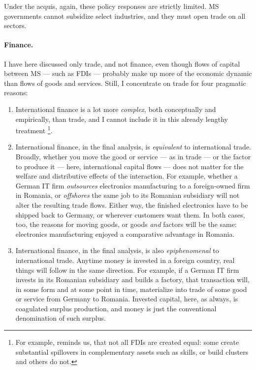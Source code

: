 \documentclass[11pt,a4paper,oneside,openright]{article}
\begin{document}
Under the acquis, again, these policy responses are strictly limited. 
\gls{MS} governments cannot subsidize select industries, and they must open trade on all sectors.

\paragraph{Finance.} 
I have here discussed only trade, and not finance, even though flows of capital between \gls{MS} --- such as \glspl{FDI} --- probably make up more of the economic dynamic than flows of goods and services. 
Still, I concentrate on trade for four pragmatic reasons:
\begin{enumerate}
	\item International finance is a lot more \emph{complex}, both conceptually and empirically, than trade, and I cannot include it in this already lengthy treatment
		\footnote{
			For example, \cite{Narula2005} reminds us, that not all \glspl{FDI} are created equal: 
			some create substantial spillovers in complementary assets such as skills, or build clusters and others do not.
		}.
	\item International finance, in the final analysis, is \emph{equivalent} to international trade. 
	Broadly, whether you move the good or service --- as in trade --- or the factor to produce it --- here, international capital flows --- does not matter for the welfare and distributive effects of the interaction. 
	For example, whether a German IT firm \emph{outsources} electronics manufacturing to a foreign-owned firm in Romania, or \emph{offshores} the same job to its Romanian subsidiary will not alter the resulting trade flows. 
	Either way, the finished electronics have to be shipped back to Germany, or wherever customers want them. 
	In both cases, too, the reasons for moving goods, or goods \emph{and} factors will be the same: 
	electronics manufacturing enjoyed a comparative advantage in Romania.
	\item International finance, in the final analysis, is also \emph{epiphenomenal} to international trade. 
	Anytime money is invested in a foreign country, real things will follow in the same direction. 
	For example, if a German IT firm invests in its Romanian subsidiary and builds a factory, that transaction will, in some form and at some point in time, materialize into trade of some good or service from Germany to Romania. 
	Invested capital, here, as always, is coagulated surplus production, and money is just the conventional denomination of such surplus. 

\end{enumerate}
\end{document}
